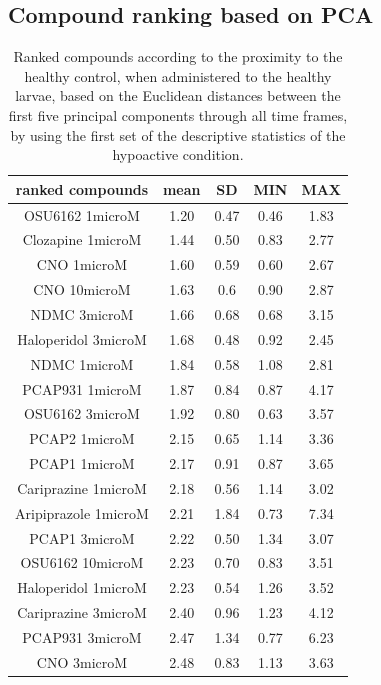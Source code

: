 \subsection{Compound ranking based on PCA}
\begin{table}[h!]\tiny
\centering
\caption{Ranked compounds according to the proximity to the healthy control, when administered to the healthy larvae, based on the Euclidean distances between the first five principal components through all time frames, by using the first set of the descriptive statistics of the hypoactive condition.}
\begin{tabular}{|c|c|c|c|c|}
\hline
ranked compounds             & mean & SD   & MIN  & MAX   \\ \hline
OSU6162 1microM       & 1.20  & 0.47 & 0.46 & 1.83  \\ \hline
Clozapine 1microM     & 1.44 & 0.50  & 0.83 & 2.77  \\ \hline
CNO 1microM           & 1.60  & 0.59 & 0.60  & 2.67  \\ \hline
CNO 10microM          & 1.63 & 0.6  & 0.90  & 2.87  \\ \hline
NDMC 3microM          & 1.66 & 0.68 & 0.68 & 3.15  \\ \hline
Haloperidol 3microM   & 1.68 & 0.48 & 0.92 & 2.45  \\ \hline
NDMC 1microM          & 1.84 & 0.58 & 1.08 & 2.81  \\ \hline
PCAP931 1microM       & 1.87 & 0.84 & 0.87 & 4.17  \\ \hline
OSU6162 3microM       & 1.92 & 0.80  & 0.63 & 3.57  \\ \hline
PCAP2 1microM         & 2.15 & 0.65 & 1.14 & 3.36  \\ \hline
PCAP1 1microM         & 2.17 & 0.91 & 0.87 & 3.65  \\ \hline
Cariprazine 1microM   & 2.18 & 0.56 & 1.14 & 3.02  \\ \hline
Aripiprazole 1microM  & 2.21 & 1.84 & 0.73 & 7.34  \\ \hline
PCAP1 3microM         & 2.22 & 0.50  & 1.34 & 3.07  \\ \hline
OSU6162 10microM      & 2.23 & 0.70  & 0.83 & 3.51  \\ \hline
Haloperidol 1microM   & 2.23 & 0.54 & 1.26 & 3.52  \\ \hline
Cariprazine 3microM   & 2.40  & 0.96 & 1.23 & 4.12  \\ \hline
PCAP931 3microM       & 2.47 & 1.34 & 0.77 & 6.23  \\ \hline
CNO 3microM           & 2.48 & 0.83 & 1.13 & 3.63  \\ \hline

\end{tabular}
\end{table}
